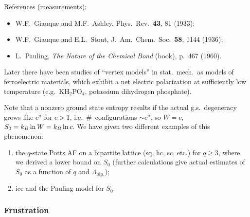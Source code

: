 References (measurements):
\begin{itemize}
  \item W.F.~Giauque and M.F.~Ashley, Phys.\ Rev.\ \textbf{43}, 81 (1933);
  \item W.F.~Giauque and E.L.~Stout, J.\ Am.\ Chem.\ Soc.\ \textbf{58}, 1144 (1936);
  \item L.~Pauling, \emph{The Nature of the Chemical Bond} (book), p.~467 (1960).
\end{itemize}
Later there have been studies of ``vertex models'' in stat.\ mech.\ as models of ferroelectric
materials, which exhibit a net electric polarization at sufficiently low temperature (e.g.\
KH$_2$PO$_4$, potassium dihydrogen phosphate).

Note that a nonzero ground state entropy results if the actual g.s.\ degeneracy grows like $c^n$
for $c>1$, i.e.\ \#~configurations $\sim c^n$, so $W = c$, $S_0 = k_{B}\ln W = k_{B}\ln c$. We have
given two different examples of this phenomenon:
\begin{enumerate}
  \item the $q$-state Potts AF on a bipartite lattice (sq, hc, sc, etc.) for $q\ge 3$, where we
    derived a lower bound on $S_0$ (further calculations give actual estimates of $S_0$ as a
    function of $q$ and $\Lambda_{\text{bip.}}$);
  \item ice and the Pauling model for $S_0$.
\end{enumerate}

\subsubsection*{Frustration}

